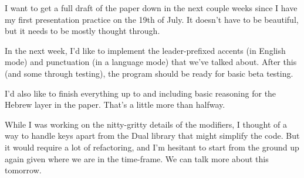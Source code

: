 \documentclass[11pt]{article}
\begin{document}
I want to get a full draft of the paper down in the next couple weeks since I have my first presentation practice on the 19th of July. It doesn't have to be beautiful, but it needs to be mostly thought through.

In the next week, I'd like to implement the leader-prefixed accents (in English mode) and punctuation (in a language mode) that we've talked about. After this (and some through testing), the program should be ready for basic beta testing.

I'd also like to finish everything up to and including basic reasoning for the Hebrew layer in the paper. That's a little more than halfway.

While I was working on the nitty-gritty details of the modifiers, I thought of a way to handle keys apart from the Dual library that might simplify the code. But it would require a lot of refactoring, and I'm hesitant to start from the ground up again given where we are in the time-frame. We can talk more about this tomorrow.
\end{document}

